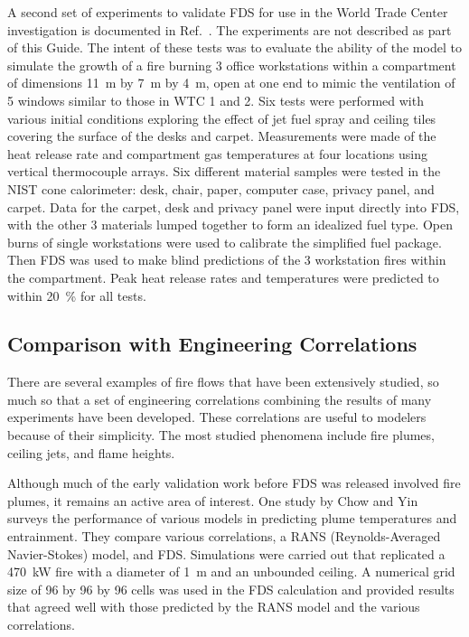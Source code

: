 A second set of experiments to validate FDS for use in the World Trade Center  investigation is  documented  in Ref.~\cite{Hamins:WTC2}.  The experiments
are not described as part of this Guide. The intent
of  these tests  was to  evaluate the ability  of the  model to simulate the growth  of a fire burning 3  office workstations within a compartment of
dimensions 11~m by 7~m by 4~m, open at one end to mimic the ventilation  of 5  windows similar to  those in  WTC 1 and  2. Six tests  were performed
with various  initial conditions  exploring the effect of jet fuel spray and ceiling tiles covering the surface of the desks and carpet. Measurements
were  made of the heat release rate and compartment  gas   temperatures  at  four   locations  using  vertical thermocouple arrays. Six different
material samples were tested in the NIST  cone calorimeter:  desk,  chair, paper,  computer case,  privacy panel, and  carpet. Data for the  carpet,
desk and  privacy panel were input directly into FDS, with the other 3 materials lumped together to form an  idealized fuel type.  Open burns of
single  workstations were used to  calibrate the simplified fuel  package. Then FDS  was used to make  blind  predictions  of   the  3  workstation
fires  within  the compartment. Peak  heat release rates and  temperatures were predicted to within 20~\% for all tests.


\subsection{Comparison with Engineering Correlations}

There are  several examples of  fire flows that have  been extensively studied, so much  so that a set of  engineering correlations combining the
results  of   many  experiments   have  been   developed.  These correlations are  useful to modelers because of  their simplicity. The most studied
phenomena include fire  plumes, ceiling jets,  and flame heights.

Although much  of the  early validation work  before FDS  was released involved fire plumes, it remains an active area of interest. One study by
Chow  and Yin~\cite{Chow:1}  surveys  the  performance of  various models in predicting plume temperatures and entrainment.  They compare various
correlations, a  RANS (Reynolds-Averaged Navier-Stokes) model, and FDS.  Simulations  were carried out that replicated  a 470~kW fire with a
diameter of  1~m and an  unbounded ceiling.  A  numerical grid size of  96 by  96 by  96 cells was  used in  the FDS  calculation and provided
results  that agreed  well with those  predicted by  the RANS model and the various correlations.

